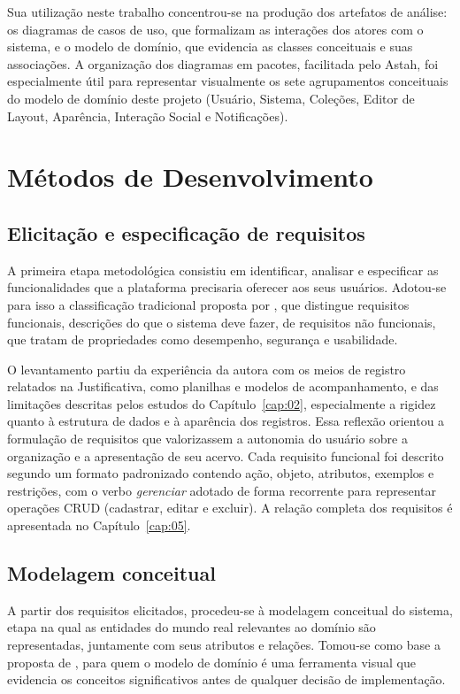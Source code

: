 Sua utilização neste trabalho concentrou-se na produção dos artefatos de análise: os diagramas de casos de uso, que formalizam as interações dos atores com o sistema, e o modelo de domínio, que evidencia as classes conceituais e suas associações. A organização dos diagramas em pacotes, facilitada pelo Astah, foi especialmente útil para representar visualmente os sete agrupamentos conceituais do modelo de domínio deste projeto (Usuário, Sistema, Coleções, Editor de Layout, Aparência, Interação Social e Notificações).

\section{Métodos de Desenvolvimento}

\subsection{Elicitação e especificação de requisitos}

A primeira etapa metodológica consistiu em identificar, analisar e especificar as funcionalidades que a plataforma precisaria oferecer aos seus usuários. Adotou-se para isso a classificação tradicional proposta por \cite{Sommerville2011}, que distingue requisitos funcionais, descrições do que o sistema deve fazer, de requisitos não funcionais, que tratam de propriedades como desempenho, segurança e usabilidade.

O levantamento partiu da experiência da autora com os meios de registro relatados na Justificativa, como planilhas e modelos de acompanhamento, e das limitações descritas pelos estudos do Capítulo~\ref{cap:02}, especialmente a rigidez quanto à estrutura de dados e à aparência dos registros. Essa reflexão orientou a formulação de requisitos que valorizassem a autonomia do usuário sobre a organização e a apresentação de seu acervo. Cada requisito funcional foi descrito segundo um formato padronizado contendo ação, objeto, atributos, exemplos e restrições, com o verbo \textit{gerenciar} adotado de forma recorrente para representar operações CRUD (cadastrar, editar e excluir). A relação completa dos requisitos é apresentada no Capítulo~\ref{cap:05}.

\subsection{Modelagem conceitual}

A partir dos requisitos elicitados, procedeu-se à modelagem conceitual do sistema, etapa na qual as entidades do mundo real relevantes ao domínio são representadas, juntamente com seus atributos e relações. Tomou-se como base a proposta de \cite{Larman2007}, para quem o modelo de domínio é uma ferramenta visual que evidencia os conceitos significativos antes de qualquer decisão de implementação.

